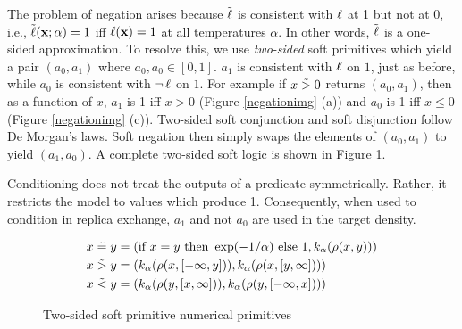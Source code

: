 The problem of negation arises because $\mathrel{\tilde{\operatorname{\ell}}}$ is consistent with $\operatorname{\ell}$ at 1 but not at 0, i.e., $\tilde{\operatorname{\ell}}(\mathbf{x}; \alpha) = 1$ iff $\operatorname{\ell}(\mathbf{x}) = 1$ at all temperatures $\alpha$.
In other words, $\mathrel{\tilde{\operatorname{\ell}}}$ is a one-sided approximation.
To resolve this, we use \emph{two-sided} soft primitives which yield a pair $(a_0, a_1)$ where $a_0, a_0 \in [0, 1]$.
$a_1$ is consistent with $\operatorname{\ell}$ on $1$, just as before, while $a_0$ is consistent with $\neg \operatorname{\ell}$ on $1$.
For example if $x \mathrel{\tilde{>}} 0$ returns $(a_0, a_1)$, then as a function of $x$, $a_1$ is 1 iff $x > 0$ (Figure \ref{negationimg} (a)) and $a_0$ is 1 iff $x \leq 0$ (Figure \ref{negationimg} (c)).
Two-sided soft conjunction and soft disjunction follow De Morgan's laws.
Soft negation then simply swaps the elements of $(a_0, a_1)$ to yield $(a_1, a_0)$.
A complete two-sided soft logic is shown in Figure \ref{softw}.

Conditioning does not treat the outputs of a predicate symmetrically.
Rather, it restricts the model to values which produce 1.
Consequently, when used to condition in replica exchange, $a_1$ and not $a_0$ are used in the target density.



\begin{figure}
  \begin{align*}
  x \mathrel{\tilde{=}} y &= (\text{if } x = y  \text{ then } \exp(-1/\alpha) \text{ else } 1, k_\alpha(\rho(x, y)))\\
  x \mathrel{\tilde{>}} y &= (k_\alpha(\rho(x, [-\infty, y])), k_\alpha(\rho(x, [y, \infty])))\\
  x \mathrel{\tilde{<}} y &= (k_\alpha(\rho(y, [x, \infty])), k_\alpha(\rho(y, [-\infty, x])))\\
  \end{align*}
  \caption{Two-sided soft primitive numerical primitives}
\label{softw}
\end{figure}
  


